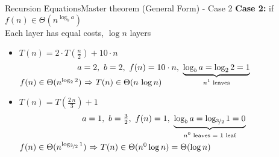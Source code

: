\begin{frame}{Recursion Equations}{Master theorem (General Form) - Case 2}
  \textbf{Case 2:}
  \hspace{1.5em} if {\color{MainA}
    $f(n) \in \Theta(n^{\log_b a})$
  }\\
  {\color{gray}Each layer has equal costs, $\log n$ layers}
  \vspace{1.0em}
  \begin{itemize}
    \item<3->
      $T(n) = 2 \cdot T(\tfrac{n}{2}) + 10 \cdot n$
      \vspace{-0.5em}
      \begin{displaymath}
        a = 2, ~ b = 2, ~ f(n) = 10 \cdot n, ~
        \smash{\underbrace{
          \log_b a = \log_2 2 = 1
        }_{\text{$n^1$ leaves}}}
      \end{displaymath}
      {\color{MainA}\begin{math}
        f(n) \in \Theta(n^{\log_2 2})$
        $\Rightarrow$
        $T(n) \in \Theta(n \, \log n)
      \end{math}}
      \vspace{1.0em}
    \item<4->
      $T(n) = T(\tfrac{2\,n}{3}) + 1$
      \vspace{-0.5em}
      \begin{displaymath}
        a = 1, ~ b = \tfrac{3}{2}, ~ f(n) = 1, ~
        \smash{\underbrace{
          \log_b a = \log_{\nicefrac{3}{2}} 1 = 0
        }_{\text{$n^0$ leaves $=$ 1 leaf}}}
      \end{displaymath}
      \hfill\\[1.0em]
      {\color{MainA}\begin{math}
        f(n) \in \Theta(n^{\log_{\nicefrac{3}{2}} 1})$
        $\Rightarrow$
        $T(n) \in \Theta(n^0 \log n) = \Theta(\log n)
      \end{math}}
  \end{itemize}
\end{frame}


